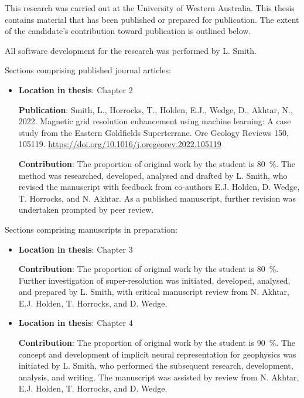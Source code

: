 % 

This research was carried out at the University of Western Australia.
This thesis contains material that has been published or prepared for publication.
The extent of the candidate's contribution toward publication is outlined below.

\smallskip{}
\noindent{}All software development for the research was performed by L. Smith.


\medskip{}
\noindent{}Sections comprising published journal articles:
\begin{itemize}
      \item{}\textbf{Location in thesis}: Chapter 2

            \textbf{Publication}: Smith, L., Horrocks, T., Holden, E.J., Wedge, D., Akhtar, N., 2022. Magnetic grid resolution enhancement using machine learning: A case study from the Eastern Goldfields Superterrane. Ore Geology Reviews 150, 105119.
            \url{https://doi.org/10.1016/j.oregeorev.2022.105119}
            
            \textbf{Contribution}: The proportion of original work by the student is \qty{80}{\percent}.
            The method was researched, developed, analysed and drafted by L. Smith, who revised the manuscript with feedback from co-authors E.J. Holden, D. Wedge, T. Horrocks, and N. Akhtar.
            As a published manuscript, further revision was undertaken prompted by peer review.
\end{itemize}

\noindent{}Sections comprising manuscripts in preparation:
\begin{itemize}
      \item{}
            \textbf{Location in thesis}: Chapter 3

            \textbf{Contribution}: The proportion of original work by the student is \qty{80}{\percent}.
            Further investigation of super-resolution was initiated, developed, analysed, and prepared by L. Smith, with critical manuscript review from N. Akhtar, E.J. Holden, T. Horrocks, and D. Wedge.

      \item{}
            \textbf{Location in thesis}: Chapter 4

            \textbf{Contribution}: The proportion of original work by the student is \qty{90}{\percent}.
            The concept and development of implicit neural representation for geophysics was initiated by L. Smith, who performed the subsequent research, development, analysis, and writing. The manuscript was assisted by review from N. Akhtar, E.J. Holden, T. Horrocks, and D. Wedge.

\end{itemize}

